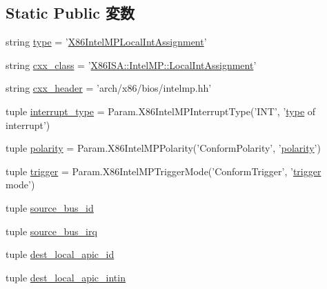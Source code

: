 \subsection*{Static Public 変数}
\begin{DoxyCompactItemize}
\item 
string \hyperlink{classIntelMP_1_1X86IntelMPLocalIntAssignment_acce15679d830831b0bbe8ebc2a60b2ca}{type} = '\hyperlink{classIntelMP_1_1X86IntelMPLocalIntAssignment}{X86IntelMPLocalIntAssignment}'
\item 
string \hyperlink{classIntelMP_1_1X86IntelMPLocalIntAssignment_a58cd55cd4023648e138237cfc0822ae3}{cxx\_\-class} = '\hyperlink{classX86ISA_1_1IntelMP_1_1LocalIntAssignment}{X86ISA::IntelMP::LocalIntAssignment}'
\item 
string \hyperlink{classIntelMP_1_1X86IntelMPLocalIntAssignment_a17da7064bc5c518791f0c891eff05fda}{cxx\_\-header} = 'arch/x86/bios/intelmp.hh'
\item 
tuple \hyperlink{classIntelMP_1_1X86IntelMPLocalIntAssignment_a47ced18ebb7927f6eede388751a1e331}{interrupt\_\-type} = Param.X86IntelMPInterruptType('INT', '\hyperlink{classIntelMP_1_1X86IntelMPLocalIntAssignment_acce15679d830831b0bbe8ebc2a60b2ca}{type} of interrupt')
\item 
tuple \hyperlink{classIntelMP_1_1X86IntelMPLocalIntAssignment_aa4bc0ac88ce7c17dc39f4f675e09fc65}{polarity} = Param.X86IntelMPPolarity('ConformPolarity', '\hyperlink{classIntelMP_1_1X86IntelMPLocalIntAssignment_aa4bc0ac88ce7c17dc39f4f675e09fc65}{polarity}')
\item 
tuple \hyperlink{classIntelMP_1_1X86IntelMPLocalIntAssignment_a36374a82ee2259459ff75b5c4b46f2c9}{trigger} = Param.X86IntelMPTriggerMode('ConformTrigger', '\hyperlink{classIntelMP_1_1X86IntelMPLocalIntAssignment_a36374a82ee2259459ff75b5c4b46f2c9}{trigger} mode')
\item 
tuple \hyperlink{classIntelMP_1_1X86IntelMPLocalIntAssignment_a6c1f8d95836f7b93621c1a4b51e63fe1}{source\_\-bus\_\-id}
\item 
tuple \hyperlink{classIntelMP_1_1X86IntelMPLocalIntAssignment_a42c96669425e02ec03b03caa9826d932}{source\_\-bus\_\-irq}
\item 
tuple \hyperlink{classIntelMP_1_1X86IntelMPLocalIntAssignment_a246eb9a5858244b91564983b17c42629}{dest\_\-local\_\-apic\_\-id}
\item 
tuple \hyperlink{classIntelMP_1_1X86IntelMPLocalIntAssignment_a78c47ead0cdf7830f38b9a797faa102f}{dest\_\-local\_\-apic\_\-intin}
\end{DoxyCompactItemize}


